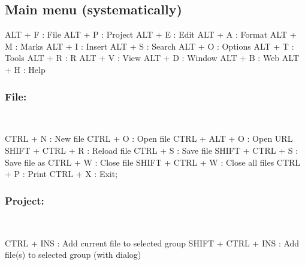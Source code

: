 \newpage
\hypertarget{basic_card_mainmenu}{}
\subsection{Main menu (systematically)}

\vspace{-0.5cm}
\begin{Rtables}[caption={[Main menu keyboard shortcuts]
    Main Menu keyboard shortcuts},
  label=menu:main]
  ALT + F : File
  ALT + P : Project
  ALT + E : Edit
  ALT + A : Format
  ALT + M : Marks
  ALT + I : Insert
  ALT + S : Search
  ALT + O : Options
  ALT + T : Tools
  ALT + R : R
  ALT + V : View
  ALT + D : Window
  ALT + B : Web
  ALT + H : Help
\end{Rtables}


\subsubsection{File:}\\

\vspace{-0.5cm}
\begin{Rtables}[caption={[File menu keyboard shortcuts]
    File menu keyboard shortcuts},
  label=menu:file]
  CTRL  + N        : New file
  CTRL  + O        : Open file
  CTRL  + ALT + O  : Open URL
  SHIFT + CTRL + R : Reload file
  CTRL  + S        : Save file
  SHIFT + CTRL + S : Save file as
  CTRL  + W        : Close file
  SHIFT + CTRL + W : Close all files
  CTRL  + P        : Print
  CTRL  + X        : Exit;
\end{Rtables}


\subsubsection{Project:}\\

\vspace{-0.5cm}
\begin{Rtables}[caption={[Project menu keyboard shortcuts]
    Project keyboard shortcuts},
  label=menu:project]
  CTRL  + INS        : Add current file to selected group
  SHIFT + CTRL + INS : Add file(s) to selected group (with dialog)
\end{Rtables}


